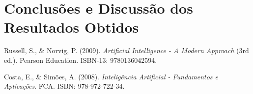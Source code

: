 \documentclass[a4paper,12pt]{scrreprt}
\begin{document}

\chapter{Conclusões e Discussão dos Resultados Obtidos}





\renewcommand\bibname{Referências}

\begin{thebibliography}{9}

Russell, S., \& Norvig, P. (2009). \textit{Artificial Intelligence - A Modern Approach} (3rd ed.). Pearson Education. ISBN-13: 9780136042594.

Costa, E., \& Simões, A. (2008). \textit{Inteligência Artificial - Fundamentos e Aplicações}. FCA. ISBN: 978-972-722-34.

\end{thebibliography}


\end{document}
